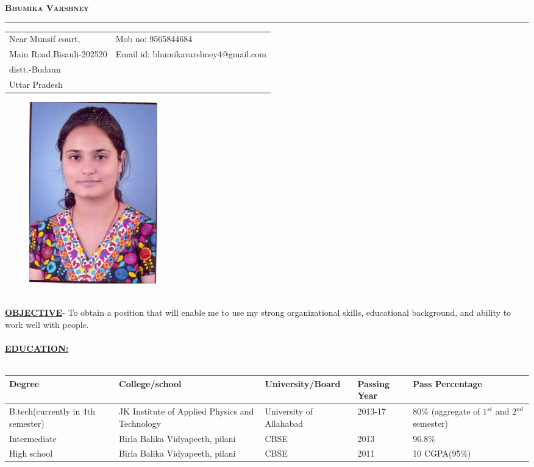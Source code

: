 \documentclass{article}
\begin{document}
	\begin{center}
		\LARGE{\color{magenta}\textsc{\textbf{Bhumika Varshney}}
			\rule{\textwidth}{0.5mm}}
	\end{center}
	\begin{tabular}{l l}
		Near Munsif court, & \qquad\qquad\qquad\qquad\qquad\qquad Mob no: 9565844684 \\
		Main Road,Bisauli-202520 & \qquad\qquad\qquad\qquad\qquad\qquad Email id: bhumikavarshney4@gmail.com \\
		distt.-Budaun & \\
		Uttar Pradesh & \\
	\end{tabular}
	\begin{figure}[h]
		\begin{flushright}
			\includegraphics[scale=0.25]{bhumika.jpg}\\
		\end{flushright}		
	\end{figure}
	\\
	\underline{\textbf{OBJECTIVE}}- To obtain a position that will enable me to use my strong organizational skills, educational background, and ability to work well with people.
		\\
		\\
		\underline{\textbf{EDUCATION:}}\\
		\\
		\begin{tabular}{|p{3cm}|p{4cm}|p{3cm}|p{2cm}|p{3cm}|}
			\hline
			\textbf{Degree}& \textbf{College/school} & \textbf{University/Board} & \textbf{Passing Year} & \textbf{Pass Percentage} \\	
			\hline
			B.tech(currently in 4th semester) & JK Institute of Applied Physics and Technology & University of Allahabad & 2013-17 & 80\% (aggregate of $1^{st}$ and $2^{nd}$ semester)\\
			\hline
			Intermediate & Birla Balika Vidyapeeth, pilani & CBSE & 2013 & 96.8\% \\
			\hline
			High school & Birla Balika Vidyapeeth, pilani & CBSE & 2011 & 10 CGPA(95\%) \\
			\hline
		\end{tabular}
\end{document}
